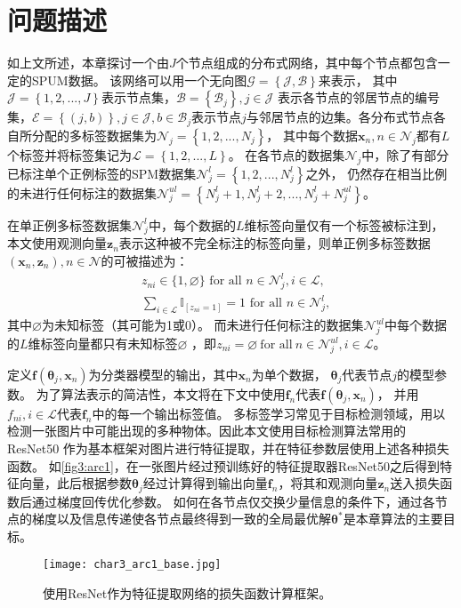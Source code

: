 \section{问题描述}\label{Char3_Preliminaries}
{如上文所述，本章探讨一个由$J$个节点组成的分布式网络，其中每个节点都包含一定的SPUM数据。}
该网络可以用一个无向图$\mathcal{G}=\left\{\mathcal{J},\mathcal{B}\right\}$来表示，
其中$\mathcal{J}=\left\{1,2,...,J\right\}$表示节点集，$\mathcal{B}=\left\{\mathcal{B}_j\right\},j\in\mathcal{J}$
表示各节点的邻居节点的编号集，$\mathcal{E}=\left\{\left(j,b\right)\right\},j\in\mathcal{J},b\in\mathcal{B}_j$表示节点$j$与邻居节点的边集。各分布式节点各自所分配的多标签数据集为$\mathcal{N}_j=\left\{1,2,...,N_j\right\}$，
其中每个数据$\boldsymbol x_n,n\in\mathcal{N}_j$都有$L$个标签并将标签集记为$\mathcal{L}=\left\{1,2,...,L\right\}$。
在各节点的数据集$\mathcal{N}_j$中，除了有部分已标注单个正例标签的SPM数据集$\mathcal{N}_j^l=\left\{1,2,...,N_j^l\right\}$之外，
仍然存在相当比例的未进行任何标注的数据集$\mathcal{N}_j^{ul}=\left\{N_j^{l}+1,N_j^{l}+2,...,N_j^l+N_j^{ul}\right\}$。

在单正例多标签数据集$\mathcal{N}_j^l$中，每个数据的$L$维标签向量仅有一个标签被标注到，本文使用观测向量$\boldsymbol z_n$表示这种被不完全标注的标签向量，则单正例多标签数据$\left(\boldsymbol x_n, \boldsymbol z_n\right), n \in \mathcal{N}$的可被描述为：
\begin{equation}
    \begin{split}
        & z_{n i} \in\{1, \varnothing\} \text { for all } n \in \mathcal{N}_j^l, i \in \mathcal{L}, \\
        & \sum_{i \in \mathcal{L}} \mathbb{I}_{\left[z_{n i}=1\right]}=1 \text { for all } n \in \mathcal{N}_j^l,
    \end{split}
\end{equation}
其中$\varnothing$为未知标签（其可能为1或0）。
{而未进行任何标注的数据集$\mathcal{N}_j^{ul}$中每个数据的$L$维标签向量都只有未知标签$\varnothing$
，即$z_{n i}=\varnothing~\text{for all}~n\in\mathcal{N}_j^{ul},i\in\mathcal{L}$。}

定义$\boldsymbol f\left(\boldsymbol\theta_j,\boldsymbol x_n\right)$为分类器模型的输出，其中$\boldsymbol x_n$为单个数据，
$\boldsymbol\theta_j$代表节点$j$的模型参数。
为了算法表示的简洁性，本文将在下文中使用$\boldsymbol f_n$代表$\boldsymbol f\left(\boldsymbol\theta_j,\boldsymbol x_n\right)$，
并用$f_{ni},i\in\mathcal{L}$代表$\boldsymbol f_n$中的每一个输出标签值。
多标签学习常见于目标检测领域，用以检测一张图片中可能出现的多种物体。因此本文使用目标检测算法常用的ResNet50
作为基本框架对图片进行特征提取，并在特征参数层使用上述各种损失函数。
如\autoref{fig3:arc1}，在一张图片经过预训练好的特征提取器ResNet50之后得到特征向量，此后根据参数$\boldsymbol \theta_j$经过计算得到输出向量$\boldsymbol f_n$，{将其和观测向量$\boldsymbol z_n$送入损失函数后通过梯度回传优化参数。
如何在各节点仅交换少量信息的条件下，通过各节点的梯度以及信息传递使各节点最终得到一致的全局最优解$\boldsymbol\theta^*$是本章算法的主要目标。}
\begin{figure}
    \centering
    \texttt{[image: char3\_arc1\_base.jpg]}
    \caption{\label{fig3:arc1}{使用ResNet作为特征提取网络的损失函数计算框架。}}
\end{figure}

